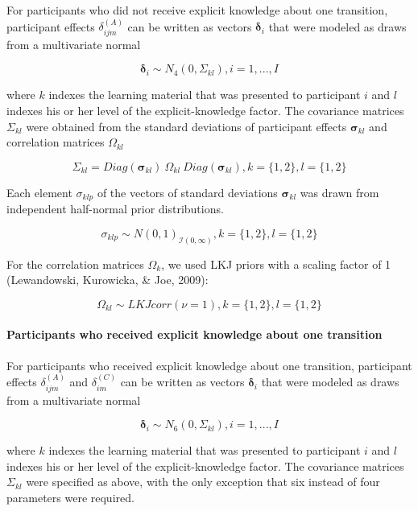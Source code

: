 \documentclass[floatsintext,man]{apa6}
\begin{document}
\begin{appendix}
  For participants who did not receive explicit knowledge about one
  transition, participant effects \(\delta_{ijm}^{(A)}\) can be written as
  vectors \(\boldsymbol{\delta}_i\) that were modeled as draws from a
  multivariate normal
  
  \[
  \boldsymbol{\delta}_i \sim N_4 (0, \Sigma_{kl}), i = 1, ..., I
  \]
  
  where \(k\) indexes the learning material that was presented to
  participant \(i\) and \(l\) indexes his or her level of the
  explicit-knowledge factor. The covariance matrices \(\Sigma_{kl}\) were
  obtained from the standard deviations of participant effects
  \(\boldsymbol{\sigma}_{kl}\) and correlation matrices \(\Omega_{kl}\)
  
  \[
  \Sigma_{kl} = Diag(\boldsymbol{\sigma}_{kl})~\Omega_{kl}~Diag(\boldsymbol{\sigma}_{kl}), k = \lbrace 1, 2 \rbrace, l = \lbrace 1, 2 \rbrace
  \]
  
  Each element \(\sigma_{klp}\) of the vectors of standard deviations
  \(\boldsymbol{\sigma}_{kl}\) was drawn from independent half-normal
  prior distributions.
  
  \[
  \sigma_{klp} \sim N (0, 1)_{\mathcal{I}(0, \infty)}, k = \lbrace 1, 2 \rbrace, l = \lbrace 1, 2 \rbrace
  \]
  
  For the correlation matrices \(\Omega_{k}\), we used LKJ priors with a
  scaling factor of 1 (Lewandowski, Kurowicka, \& Joe, 2009):
  
  \[
  \Omega_{kl} \sim \textit{LKJcorr}(\nu = 1), k = \lbrace 1, 2 \rbrace, l = \lbrace 1, 2 \rbrace
  \]
  
  \paragraph{Participants who received explicit knowledge about one
  transition}\label{participants-who-received-explicit-knowledge-about-one-transition}
  
  For participants who received explicit knowledge about one transition,
  participant effects \(\delta_{ijm}^{(A)}\) and \(\delta_{im}^{(C)}\) can
  be written as vectors \(\boldsymbol{\delta}_i\) that were modeled as
  draws from a multivariate normal
  
  \[
  \boldsymbol{\delta}_i \sim N_6 (0, \Sigma_{kl}), i = 1, ..., I
  \]
  
  where \(k\) indexes the learning material that was presented to
  participant \(i\) and \(l\) indexes his or her level of the
  explicit-knowledge factor. The covariance matrices \(\Sigma_{kl}\) were
  specified as above, with the only exception that six instead of four
  parameters were required.
  

\end{appendix}
\end{document}
